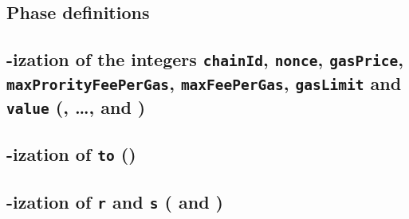 \subsection{Phase definitions}              \label{rlptxn: phase definitions}                 

\subsection{\rlp{}-ization of the integers
\texttt{chainId},
\texttt{nonce},
\texttt{gasPrice},
\texttt{maxProrityFeePerGas},
\texttt{maxFeePerGas},
\texttt{gasLimit} and \texttt{value} (\phaseChainId{}, \dots, \phaseGasLimit{} and \phaseValue{})}
                                                                                              
\subsection{\rlp{}-ization of \texttt{to} (\phaseTo)}                                             
\subsection{\rlp{}-ization of \texttt{r} and \texttt{s} (\phaseR{} and \phaseS)}              
